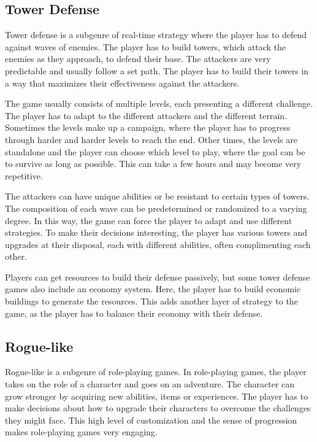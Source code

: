 \subsection{Tower Defense}

Tower defense is a subgenre of real-time strategy where the player has to defend against waves of enemies.
The player has to build towers, which attack the enemies as they approach, to defend their base.
The attackers are very predictable and usually follow a set path.
The player has to build their towers in a way that maximizes their effectiveness against the attackers.

The game usually consists of multiple levels, each presenting a different challenge.
The player has to adapt to the different attackers and the different terrain.
Sometimes the levels make up a campaign, where the player has to progress through harder and harder levels to reach the end.
Other times, the levels are standalone and the player can choose which level to play, where the goal can be to survive as long as possible.
This can take a few hours and may become very repetitive.

The attackers can have unique abilities or be resistant to certain types of towers.
The composition of each wave can be predetermined or randomized to a varying degree.
In this way, the game can force the player to adapt and use different strategies.
To make their decisions interesting, the player has various towers and upgrades at their disposal, each with different abilities, often complimenting each other.

Players can get resources to build their defense passively, but some tower defense games also include an economy system.
Here, the player has to build economic buildings to generate the resources.
This adds another layer of strategy to the game, as the player has to balance their economy with their defense.

\subsection{Rogue-like}

Rogue-like is a subgenre of role-playing games.
In role-playing games, the player takes on the role of a character and goes on an adventure.
The character can grow stronger by acquiring new abilities, items or experiences.
The player has to make decisions about how to upgrade their characters to overcome the challenges they might face.
This high level of customization and the sense of progression makes role-playing games very engaging.

